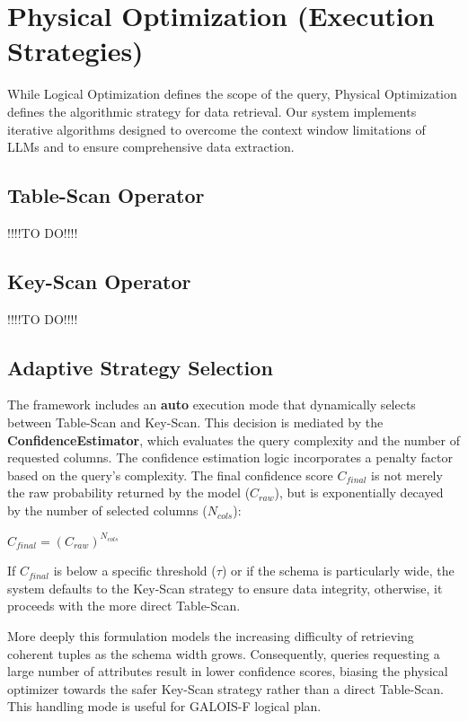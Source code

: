 \section{Physical Optimization (Execution Strategies)}
While Logical Optimization defines the scope of the query, Physical Optimization defines the algorithmic strategy for data retrieval. Our system implements iterative algorithms designed to overcome the context window limitations of LLMs and to ensure comprehensive data extraction.

\subsection{Table-Scan Operator}
!!!!TO DO!!!!

\subsection{Key-Scan Operator}
!!!!TO DO!!!!

\subsection{Adaptive Strategy Selection}
The framework includes an \textbf{auto} execution mode that dynamically selects between Table-Scan and Key-Scan. This decision is mediated by the \textbf{ConfidenceEstimator}, which evaluates the query complexity and the number of requested columns. The confidence estimation logic incorporates a penalty factor based on the query's complexity. The final confidence score \texttt{$C_{final}$} is not merely the raw probability returned by the model ($C_{raw}$), but is exponentially decayed by the number of selected columns ($N_{cols}$):

\centering
$C_{final} = (C_{raw})^{N_{cols}}$
\centering

If $C_{final}$  is below a specific threshold ($\tau$) or if the schema is particularly wide, the system defaults to the Key-Scan strategy to ensure data integrity, otherwise, it proceeds with the more direct Table-Scan.

More deeply this formulation models the increasing difficulty of retrieving coherent tuples as the schema width grows. Consequently, queries requesting a large number of attributes result in lower confidence scores, biasing the physical optimizer towards the safer Key-Scan strategy rather than a direct Table-Scan.
This handling mode is useful for GALOIS-F logical plan.